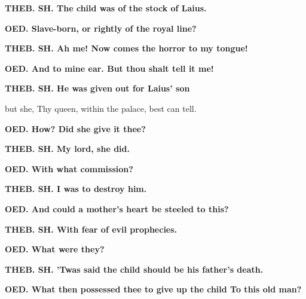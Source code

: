\documentclass[11pt,letter]{book}
\begin{document}
\par \textbf{THEB. SH. The child was of the stock of Laius.}
\par 

\par \textbf{OED. Slave-born, or rightly of the royal line?}
\par 

\par \textbf{THEB. SH. Ah me! Now comes the horror to my tongue!}
\par 

\par \textbf{OED. And to mine ear. But thou shalt tell it me!}
\par 

\par \textbf{THEB. SH. He was given out for Laius’ son}
\par   but she, Thy queen, within the palace, best can tell.

\par \textbf{OED. How? Did she give it thee?}
\par 

\par \textbf{THEB. SH. My lord, she did.}
\par 

\par \textbf{OED. With what commission?}
\par 

\par \textbf{THEB. SH. I was to destroy him.}
\par 

\par \textbf{OED. And could a mother’s heart be steeled to this?}
\par 

\par \textbf{THEB. SH. With fear of evil prophecies.}
\par 

\par \textbf{OED. What were they?}
\par 

\par \textbf{THEB. SH. ’Twas said the child should be his father’s death.}
\par 

\par \textbf{OED. What then possessed thee to give up the child To this old man?}
\par 
\end{document}
